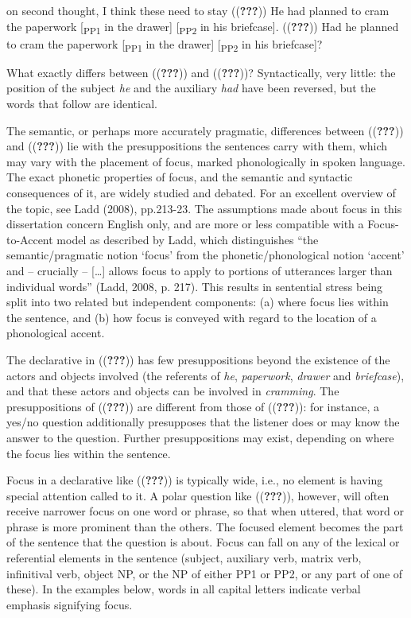 \documentclass[12pt,oneside]{book}
\begin{document}
on second thought, I think these need to stay
(({\textbf{???}})) He had planned to cram the paperwork {[}\textsubscript{PP1} in the drawer{]} {[}\textsubscript{PP2} in his briefcase{]}.
(({\textbf{???}})) Had he planned to cram the paperwork {[}\textsubscript{PP1} in the drawer{]} {[}\textsubscript{PP2} in his briefcase{]}?

What exactly differs between (({\textbf{???}})) and (({\textbf{???}}))? Syntactically, very little: the position of the subject \emph{he} and the auxiliary \emph{had} have been reversed, but the words that follow are identical.

The semantic, or perhaps more accurately pragmatic, differences between (({\textbf{???}})) and (({\textbf{???}})) lie with the presuppositions the sentences carry with them, which may vary with the placement of focus, marked phonologically in spoken language. The exact phonetic properties of focus, and the semantic and syntactic consequences of it, are widely studied and debated. For an excellent overview of the topic, see Ladd (2008), pp.213-23. The assumptions made about focus in this dissertation concern English only, and are more or less compatible with a Focus-to-Accent model as described by Ladd, which distinguishes ``the semantic/pragmatic notion `focus' from the phonetic/phonological notion `accent' and -- crucially -- {[}\ldots{}{]} allows focus to apply to portions of utterances larger than individual words'' (Ladd, 2008, p. 217). This results in sentential stress being split into two related but independent components: (a) where focus lies within the sentence, and (b) how focus is conveyed with regard to the location of a phonological accent.

The declarative in (({\textbf{???}})) has few presuppositions beyond the existence of the actors and objects involved (the referents of \emph{he}, \emph{paperwork}, \emph{drawer} and \emph{briefcase}), and that these actors and objects can be involved in \emph{cramming}. The presuppositions of (({\textbf{???}})) are different from those of (({\textbf{???}})): for instance, a yes/no question additionally presupposes that the listener does or may know the answer to the question. Further presuppositions may exist, depending on where the focus lies within the sentence.

Focus in a declarative like (({\textbf{???}})) is typically wide, i.e., no element is having special attention called to it. A polar question like (({\textbf{???}})), however, will often receive narrower focus on one word or phrase, so that when uttered, that word or phrase is more prominent than the others. The focused element becomes the part of the sentence that the question is about. Focus can fall on any of the lexical or referential elements in the sentence (subject, auxiliary verb, matrix verb, infinitival verb, object NP, or the NP of either PP1 or PP2, or any part of one of these). In the examples below, words in all capital letters indicate verbal emphasis signifying focus.
\end{document}
